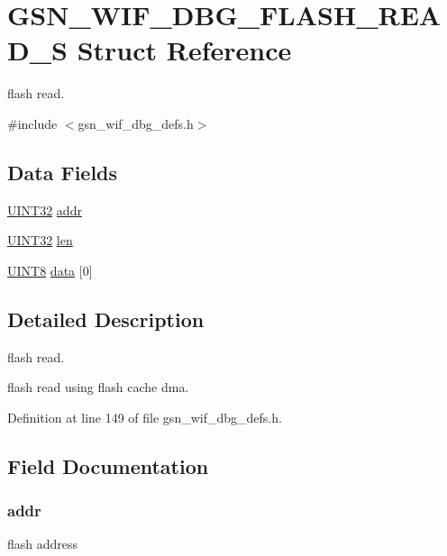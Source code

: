 \hypertarget{a00330}{
\section{GSN\_\-WIF\_\-DBG\_\-FLASH\_\-READ\_\-S Struct Reference}
\label{a00330}
}


flash read.  




{\ttfamily \#include $<$gsn\_\-wif\_\-dbg\_\-defs.h$>$}

\subsection*{Data Fields}
\begin{DoxyCompactItemize}
\item 
\hyperlink{a00660_gae1e6edbbc26d6fbc71a90190d0266018}{UINT32} \hyperlink{a00330_a211571ed47a0fee2d898236395234dab}{addr}
\item 
\hyperlink{a00660_gae1e6edbbc26d6fbc71a90190d0266018}{UINT32} \hyperlink{a00330_ab9abc6ede61238a05664f9c37e4412c3}{len}
\item 
\hyperlink{a00660_gab27e9918b538ce9d8ca692479b375b6a}{UINT8} \hyperlink{a00330_a29500e452cff835f2b70d1dff36f918a}{data} \mbox{[}0\mbox{]}
\end{DoxyCompactItemize}


\subsection{Detailed Description}
flash read. 

flash read using flash cache dma. 

Definition at line 149 of file gsn\_\-wif\_\-dbg\_\-defs.h.



\subsection{Field Documentation}
\hypertarget{a00330_a211571ed47a0fee2d898236395234dab}{
\subsubsection[{addr}]{ {\bf addr}}}
\label{a00330_a211571ed47a0fee2d898236395234dab}
flash address 

